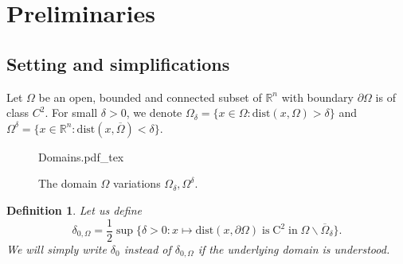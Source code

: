 \documentclass[11pt,reqno]{amsart}
\numberwithin{figure}{section}
\theoremstyle{plain}
\newtheorem{defn}{Definition}
\theoremstyle{remark}
\numberwithin{equation}{section}
\newcommand{\rmC}{\mathrm{C}}
\newcommand{\incfig}[1]{%
    \def\svgwidth{\columnwidth}
    {#1.pdf_tex}
}
\begin{document}

\section{Preliminaries}\label{sec:prelim} 
\subsection{Setting and simplifications} Let $\Omega$ be an open, bounded and connected subset of $\mathbb{R}^n$ with boundary $\partial\Omega$ is of class $C^2$. For small $\delta>0$, we denote $\Omega_\delta = \{x\in \Omega: \mathrm{dist}(x,\Omega) > \delta\}$ and $\Omega^\delta = \{x\in \mathbb{R}^n: \mathrm{dist}(x,\overline{\Omega}) < \delta\}$. 
\begin{figure}[ht]
    \centering
    \def\svgwidth{0.47\columnwidth}
    {Domains.pdf_tex}
    \caption{The domain $\Omega$ variations $\Omega_\delta, \Omega^\delta$.}
    \label{fig:Domains}
\end{figure}

\begin{defn} Let us define
\begin{equation}\label{def:delta_0}
    \delta_{0,\Omega} = \frac{1}{2}\sup \big\{ \delta > 0: x\mapsto\mathrm{dist}(x,\partial\Omega)\;\text{is}\;\rmC^2\;\text{in}\;\Omega\backslash\overline{\Omega}_{\delta} \big\}.
\end{equation}
We will simply write $\delta_0$ instead of $\delta_{0,\Omega}$ if the underlying domain is understood.
\end{defn}
\end{document}
